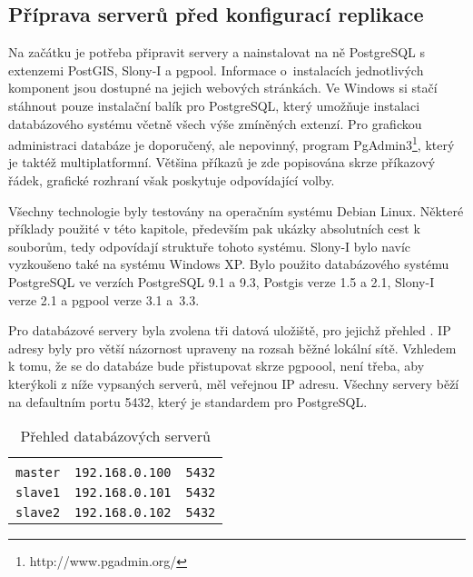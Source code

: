       \subsection{Příprava serverů před konfigurací replikace}
      \label{kPriprava}
Na začátku je potřeba připravit servery a nainstalovat na ně PostgreSQL s extenzemi PostGIS, Slony-I a pgpool. Informace o~instalacích jednotlivých komponent jsou dostupné na jejich webových stránkách. Ve Windows si stačí stáhnout pouze instalační balík pro PostgreSQL, který umožňuje instalaci databázového systému včetně všech výše zmíněných extenzí. Pro grafickou administraci databáze je doporučený, ale nepovinný, program \mbox{PgAdmin3}\footnote{http://www.pgadmin.org/}, který je taktéž multiplatformní. Většina příkazů je zde popisována skrze příkazový řádek, grafické rozhraní však poskytuje odpovídající volby.

Všechny technologie byly testovány na operačním systému Debian Linux. Některé příklady použité v této kapitole, především pak ukázky absolutních cest k souborům, tedy odpovídají struktuře tohoto systému. Slony-I bylo navíc vyzkoušeno také na systému Windows XP. Bylo použito databázového systému PostgreSQL ve verzích PostgreSQL 9.1 a 9.3, Postgis verze 1.5 a 2.1, Slony-I verze 2.1 a pgpool verze 3.1 a~3.3.

Pro databázové servery byla zvolena tři datová uložiště, pro jejichž přehled . IP adresy byly pro větší názornost upraveny na rozsah běžné lokální sítě. Vzhledem k tomu, že se do databáze bude přistupovat skrze pgpoool, není třeba, aby kterýkoli z níže vypsaných serverů, měl veřejnou IP adresu. Všechny servery běží na defaultním portu 5432, který je standardem pro PostgreSQL.

        \begin{table}[H]
          \caption[Přehled databázových serverů]{Přehled databázových serverů}
            \label{tServery}
            \begin{center}
            \begin{tabular}{|lll|}
              \hline
              \color{purpurova7}{název serveru} & \color{purpurova7}{IP adresa} & \color{purpurova7}{port}\\
                                 \texttt{master} & \texttt{192.168.0.100} & \texttt{5432}\\
                                 \texttt{slave1} & \texttt{192.168.0.101} & \texttt{5432}\\
                                 \texttt{slave2} & \texttt{192.168.0.102} & \texttt{5432}\\
              \hline
              \end{tabular}
            \end{center}
        \end{table}

